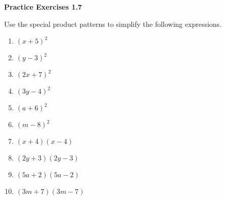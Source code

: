\vspace{1ex}
\noindent\textbf{Practice Exercises 1.7}

\vspace{0.75ex}

Use the special product patterns to simplify the following expressions.
\begin{multicols}{2}
\begin{enumerate}
    \item \( (x + 5)^2 \)
    \item \( (y - 3)^2 \)
    \item \( (2x + 7)^2 \)
    \item \( (3y - 4)^2 \)
    \item \( (a + 6)^2 \)
    \item \( (m - 8)^2 \)
    \item \( (x + 4)(x - 4) \)
    \item \( (2y + 3)(2y - 3) \)
    \item \( (5a + 2)(5a - 2) \)
    \item \( (3m + 7)(3m - 7) \)
\end{enumerate}
\end{multicols} 